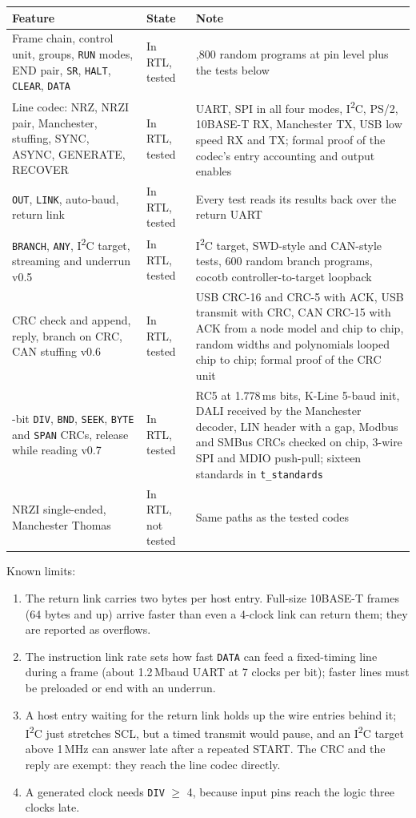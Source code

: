 \documentclass[11pt,a4paper]{article}
\newcommand{\vfive}{\textcolor{fivec}{\textsf{\small v0.5}}}
\newcommand{\vsix}{\textcolor{sixc}{\textsf{\small v0.6}}}
\newcommand{\vseven}{\textcolor{sevenc}{\textsf{\small v0.7}}}
\newcommand{\sig}[1]{\texttt{#1}}
\begin{document}
\begin{center}
\begin{tabularx}{\linewidth}{@{}>{\raggedright\arraybackslash}p{5.6cm} l >{\raggedright\arraybackslash}X@{}}
\toprule
Feature & State & Note \\
\midrule
Frame chain, control unit, groups, \sig{RUN} modes, END pair, \sig{SR}, \sig{HALT}, \sig{CLEAR}, \sig{DATA} & In RTL, tested & 1,800 random programs at pin level plus the tests below \\
Line codec: NRZ, NRZI pair, Manchester, stuffing, SYNC, ASYNC, GENERATE, RECOVER & In RTL, tested & UART, SPI in all four modes, I\textsuperscript{2}C, PS/2, 10BASE-T RX, Manchester TX, USB low speed RX and TX; formal proof of the codec's entry accounting and output enables \\
\sig{OUT}, \sig{LINK}, auto-baud, return link & In RTL, tested & Every test reads its results back over the return UART \\
\sig{BRANCH}, \sig{ANY}, I\textsuperscript{2}C target, streaming and underrun \vfive & In RTL, tested & I\textsuperscript{2}C target, SWD-style and CAN-style tests, 600 random branch programs, cocotb controller-to-target loopback \\
CRC check and append, reply, branch on CRC, CAN stuffing \vsix & In RTL, tested & USB CRC-16 and CRC-5 with ACK, USB transmit with CRC, CAN CRC-15 with ACK from a node model and chip to chip, random widths and polynomials looped chip to chip; formal proof of the CRC unit \\
22-bit \sig{DIV}, \sig{BND}, \sig{SEEK}, \sig{BYTE} and \sig{SPAN} CRCs, release while reading \vseven & In RTL, tested & RC5 at 1.778\,ms bits, K-Line 5-baud init, DALI received by the Manchester decoder, LIN header with a gap, Modbus and SMBus CRCs checked on chip, 3-wire SPI and MDIO push-pull; sixteen standards in \sig{t\_standards} \\
NRZI single-ended, Manchester Thomas & In RTL, not tested & Same paths as the tested codes \\
\bottomrule
\end{tabularx}
\end{center}

Known limits:
\begin{enumerate}
\item The return link carries two bytes per host entry. Full-size 10BASE-T frames (64 bytes and up) arrive faster than even a 4-clock link can return them; they are reported as overflows.
\item The instruction link rate sets how fast \sig{DATA} can feed a fixed-timing line during a frame (about 1.2\,Mbaud UART at 7 clocks per bit); faster lines must be preloaded or end with an underrun.
\item A host entry waiting for the return link holds up the wire entries behind it; I\textsuperscript{2}C just stretches SCL, but a timed transmit would pause, and an I\textsuperscript{2}C target above 1\,MHz can answer late after a repeated START. The CRC and the reply are exempt: they reach the line codec directly.
\item A generated clock needs \sig{DIV} $\ge$ 4, because input pins reach the logic three clocks late.
\end{enumerate}
\end{document}
